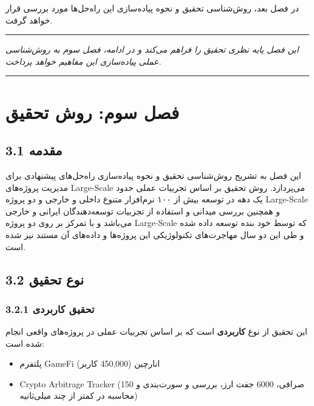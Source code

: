 \documentclass[
]{article}
\providecommand{\tightlist}{%
  \setlength{\itemsep}{0pt}\setlength{\parskip}{0pt}}
\begin{document}
در فصل بعد، روش‌شناسی تحقیق و نحوه پیاده‌سازی این راه‌حل‌ها مورد بررسی قرار
خواهد گرفت.

\begin{center}\rule{0.5\linewidth}{0.5pt}\end{center}

\emph{این فصل پایه نظری تحقیق را فراهم می‌کند و در ادامه، فصل سوم به
روش‌شناسی عملی پیاده‌سازی این مفاهیم خواهد پرداخت.}

\begin{center}\rule{0.5\linewidth}{0.5pt}\end{center}

\section{فصل سوم: روش
تحقیق}\label{ux641ux635ux644-ux633ux648ux645-ux631ux648ux634-ux62aux62dux642ux6ccux642}

\subsection{3.1 مقدمه}\label{ux645ux642ux62fux645ux647-1}

این فصل به تشریح روش‌شناسی تحقیق و نحوه پیاده‌سازی راه‌حل‌های پیشنهادی برای
مدیریت پروژه‌های Large-Scale می‌پردازد. روش تحقیق بر اساس تجربیات عملی
حدود یک دهه در توسعه بیش از ۱۰۰ نرم‌افزار متنوع داخلی و خارجی و دو پروژه
Large-Scale و همچنین بررسی میدانی و استفاده از تجربیات توسعه‌دهندگان
ایرانی و خارجی می‌باشد و با تمرکز بر روی دو پروژه Large-Scale که توسط خود
بنده توسعه داده شده و طی این دو سال مهاجرت‌های تکنولوژیکی این پروژه‌ها و
داده‌های آن مستند نیز شده است.

\subsection{3.2 نوع
تحقیق}\label{ux646ux648ux639-ux62aux62dux642ux6ccux642}

\subsubsection{3.2.1 تحقیق
کاربردی}\label{ux62aux62dux642ux6ccux642-ux6a9ux627ux631ux628ux631ux62fux6cc}

این تحقیق از نوع \textbf{کاربردی} است که بر اساس تجربیات عملی در
پروژه‌های واقعی انجام شده است:

\begin{itemize}
\tightlist
\item
  پلتفرم GameFi انارچین (450,000 کاربر)
\item
  Crypto Arbitrage Tracker (150 صرافی، 6000 جفت ارز، بررسی و سورت‌بندی و
  محاسبه در کمتر از چند میلی‌ثانیه)
\end{itemize}
\end{document}
